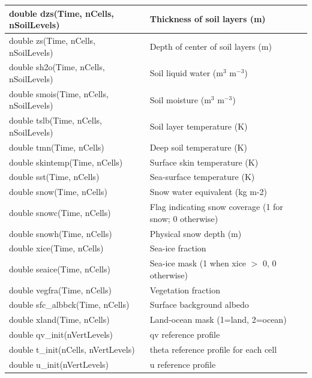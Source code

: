 \documentclass[11pt]{report}
\begin{document}
{\begin{longtable}{|p{2.5in} |p{3.75in}|}
        double dzs(Time, nCells, nSoilLevels)       & Thickness of soil layers (m) \\ \hline
        double zs(Time, nCells, nSoilLevels)        & Depth of center of soil layers (m) \\ \hline
        double \hfil\break sh2o(Time, nCells, nSoilLevels)      & Soil liquid water (m$^{3}$ m$^{-3}$) \\ \hline
        double \hfil\break smois(Time, nCells, nSoilLevels)     & Soil moisture (m$^{3}$ m$^{-3}$) \\ \hline
        double tslb(Time, nCells, nSoilLevels)      & Soil layer temperature (K) \\ \hline
        double tmn(Time, nCells)                    & Deep soil temperature (K) \\ \hline
        double skintemp(Time, nCells)               & Surface skin temperature (K) \\ \hline
        double sst(Time, nCells)                    & Sea-surface temperature (K) \\ \hline
        double snow(Time, nCells)                   & Snow water equivalent (kg m-2) \\ \hline
        double snowc(Time, nCells)                  & Flag indicating snow coverage (1 for snow; 0 otherwise) \\ \hline
        double snowh(Time, nCells)                  & Physical snow depth (m) \\ \hline
        double xice(Time, nCells)                   & Sea-ice fraction \\ \hline
        double seaice(Time, nCells)                 & Sea-ice mask (1 when xice $>$ 0, 0 otherwise) \\ \hline
        double vegfra(Time, nCells)                 & Vegetation fraction \\ \hline
        double sfc\_albbck(Time, nCells)            &  Surface background albedo \\ \hline
        double xland(Time, nCells)                  & Land-ocean mask (1=land, 2=ocean) \\ \hline
        double qv\_init(nVertLevels)           &               qv reference profile \\ \hline
        double t\_init(nCells, nVertLevels)    &               theta reference profile for each cell \\ \hline
        double u\_init(nVertLevels)            &               u reference profile \\ \hline

\end{longtable}}
\end{document}
